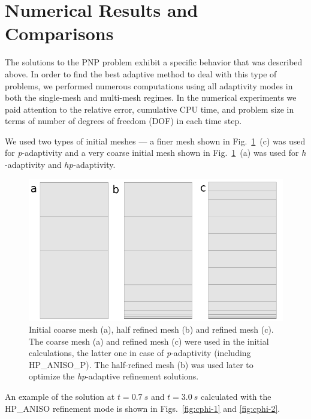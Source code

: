 \section{Numerical Results and Comparisons}\label{sec:results}


The solutions to the PNP problem exhibit a specific behavior that was 
described above. In order to find the best adaptive method to deal with 
this type of problems, we performed numerous computations using all 
adaptivity modes in both the single-mesh and multi-mesh regimes.
In the numerical experiments we paid attention to the 
relative error, cumulative CPU time, and problem size 
in terms of number of degrees of freedom (DOF) in each 
time step. 

We used two types of initial meshes --- a finer mesh shown 
in Fig.~\ref{fig:mesh}~(c) was used for \emph{p}-adaptivity
and a very coarse initial mesh shown in  Fig.~\ref{fig:mesh}~(a) was 
used for $h$-adaptivity and $hp$-adaptivity.

\begin{figure}[!ht]
  \begin{centering}
  \includegraphics[width=.8\columnwidth]{mesh}
  \caption{\label{fig:mesh} Initial coarse mesh (a),
  	half refined mesh (b) and refined mesh (c). The coarse mesh (a)
	and refined mesh (c) were used in the initial calculations, the latter one
	in case of \emph{p}-adaptivity (including HP\_ANISO\_P). The half-refined mesh (b) was
	used later to optimize the \emph{hp}-adaptive refinement solutions.}
  \end{centering}
\end{figure}

An example of the solution at $t=0.7\ s$ and $t=3.0\ s$ 
calculated with the HP\_ANISO refinement mode is shown
in Figs.~\ref{fig:cphi-1} and \ref{fig:cphi-2}. 


